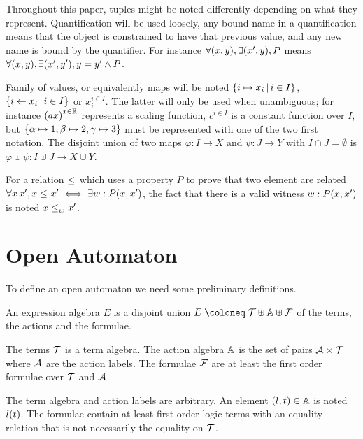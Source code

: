 \documentclass{article}
\begin{document}
Throughout this paper, tuples might be noted differently depending on what they represent.
Quantification will be used loosely, any bound name in a quantification means that the object is constrained to have that previous value, and any new name is bound by the quantifier.
For instance \(\forall \mpar{x, y}, \exists \mpar{x', y}, P\) means \(\forall \mpar{x, y}, \exists \mpar{x', y'}, y = y' \wedge P\).

Family of values, or equivalently maps will be noted \(\mset{i \mapsto x_i}{i \in I}\), \(\mset{i \gets x_i}{i \in I}\) or \(x_i^{i \in I}\).
The latter will only be used when unambiguous; for instance \(\mpar{ax}^{x \in \setR}\) represents a scaling function, \(c^{i \in I}\) is a constant function over \(I\), but \(\mbrc{\alpha \mapsto 1, \beta \mapsto 2, \gamma \mapsto 3}\) must be represented with one of the two first notation.
The disjoint union of two maps \(\varphi: I \to X\) and \(\psi: J \to Y\) with \(I \cap J = \emptyset\) is \(\varphi \uplus \psi: I \uplus J \to X \cup Y\).

For a relation \(\wrel{}{}{}\) which uses a property \(P\) to prove that two element are related \(\forall x \, x', x \wrel{}{}{} x' \iff \exists w: P\mpar{x, x'}\), the fact that there is a valid witness \(w: P\mpar{x, x'}\) is noted \(\wrel{x}{x'}{w}\).

\section{Open Automaton}\label{sec:def}
To define an open automaton we need some preliminary definitions.
\begin{defi}
An expression algebra \(E\) is a disjoint union \(E \defobject \terms \uplus \actions \uplus \formulae\) of the terms, the actions and the formulae.

The terms \(\terms\) is a term algebra.
The action algebra \(\actions\) is the set of pairs \(\labels \times \terms\) where \(\labels\) are the action labels.
The formulae \(\formulae\) are at least the first order formulae over \(\terms\) and \(\labels\).
\end{defi}
The term algebra and action labels are arbitrary.
An element \(\mpar{l, t} \in \actions\) is noted \(l\mpar{t}\).
The formulae contain at least first order logic terms with an equality relation that is not necessarily  the equality on \(\terms\).
\end{document}

